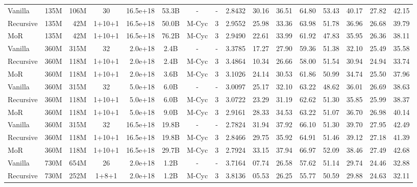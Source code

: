 \begin{table}[h!]
{\begin{tabular}{lc|cccc|cc|c|cccccc|c}
    \midrule
    \rowcolor[gray]{0.9}
    Vanilla & 135M & 106M & 30 & 16.5e+18  & \!\!\!53.3B & -  & - & 2.8432 & 30.16 & 36.51 & 64.80 & 53.43 & 40.17 & 27.82 & 42.15  \\
    Recursive & 135M & \,\,\,42M & 1+10+1 & 16.5e+18  & \!\!\!50.0B & M-Cyc  & 3 & 2.9552 & 25.98 & 33.36 & 63.98 & 51.78 & 36.96 & 26.68 & 39.79  \\
    MoR & 135M & \,\,\,42M & 1+10+1 & 16.5e+18  & \!\!\!76.2B & M-Cyc  & 3 & 2.9490 & 22.61 & 33.99 & 61.92 & 47.83 & 35.95 & 26.36 & 38.11  \\
    \midrule
    \midrule
    Vanilla & 360M & 315M & 32 & \,\,\,2.0e+18   & 2.4B & -  & - & 3.3785 & 17.27 & 27.90 & 59.36 & 51.38 & 32.10 & 25.49 & 35.58  \\
    Recursive & 360M & 118M & 1+10+1 & \,\,\,2.0e+18   & 2.4B & M-Cyc  & 3 & 3.4864 & 10.34 & 26.66 & 58.00 & 51.54 & 30.94 & 24.94 & 33.74  \\
    \rowcolor[gray]{0.9}
    MoR & 360M & 118M & 1+10+1 & \,\,\,2.0e+18   & 3.6B & M-Cyc  & 3 & 3.1026 & 24.14 & 30.53 & 61.86 & 50.99 & 34.74 & 25.50 & 37.96  \\
    \midrule
    Vanilla & 360M & 315M & 32 &  \,\,\,5.0e+18   & 6.0B & -  & - & 3.0097 & 25.17 & 32.10 & 63.22 & 48.62 & 36.01 & 26.69 & 38.63  \\
    Recursive & 360M & 118M & 1+10+1 &  \,\,\,5.0e+18   & 6.0B & M-Cyc  & 3 & 3.0722 & 23.29 & 31.19 & 62.62 & 51.30 & 35.85 & 25.99 & 38.37  \\
    \rowcolor[gray]{0.9}
    MoR & 360M & 118M & 1+10+1 &  \,\,\,5.0e+18   & 9.0B & M-Cyc  & 3 & 2.9161 & 28.33 & 34.53 & 63.22 & 51.07 & 36.70 & 26.98 & 40.14  \\
    \midrule
    Vanilla & 360M & 315M & 32 & 16.5e+18  & \!\!\!19.8B & -  & - & 2.7824 & 31.94 & 37.92 & 66.10 & 51.30 & 39.70 & 27.95 & 42.49  \\
    Recursive & 360M & 118M & 1+10+1 & 16.5e+18  & \!\!\!19.8B & M-Cyc  & 3 & 2.8466 & 29.75 & 35.92 & 64.91 & 51.46 & 39.12 & 27.18 & 41.39  \\
    \rowcolor[gray]{0.9}
    MoR & 360M & 118M & 1+10+1 & 16.5e+18  & \!\!\!29.7B & M-Cyc  & 3 & 2.7924 & 33.15 & 37.94 & 66.97 & 52.09 & 38.46 & 27.49 & 42.68  \\
    \midrule
    \midrule
    Vanilla & 730M & 654M & 26 & \,\,\,2.0e+18   & 1.2B & -  & - & 3.7164 & 07.74 & 26.58 & 57.62 & 51.14 & 29.74 & 24.46 & 32.88  \\
    Recursive & 730M & 252M & 1+8+1 & \,\,\,2.0e+18   & 1.2B & M-Cyc  & 3 & 3.8136 & 05.53 & 26.25 & 55.77 & 50.59 & 29.88 & 24.63 & 32.11  \\

\end{tabular}}
\end{table}
